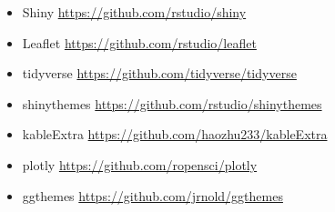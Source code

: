 \documentclass[]{article}
\providecommand{\tightlist}{%
  \setlength{\itemsep}{0pt}\setlength{\parskip}{0pt}}
\begin{document}
\begin{itemize}
\tightlist
\item
  Shiny \url{https://github.com/rstudio/shiny}
\item
  Leaflet \url{https://github.com/rstudio/leaflet}
\item
  tidyverse \url{https://github.com/tidyverse/tidyverse}
\item
  shinythemes \url{https://github.com/rstudio/shinythemes}
\item
  kableExtra \url{https://github.com/haozhu233/kableExtra}
\item
  plotly \url{https://github.com/ropensci/plotly}
\item
  ggthemes \url{https://github.com/jrnold/ggthemes}
\end{itemize}
\end{document}
